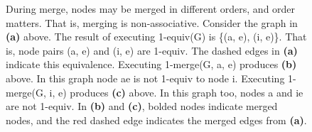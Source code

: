 \begin{figure}
\centering
{}
\caption{During merge, nodes may be merged in different orders, and
  order matters. That is, merging is non-associative.  Consider the
  graph in \textbf{(a)} above. The result of executing 1-equiv(G) is
  \{(a, e), (i, e)\}. That is, node pairs (a, e) and (i, e) are
  1-equiv. The dashed edges in \textbf{(a)} indicate this
  equivalence. Executing 1-merge(G, a, e) produces \textbf{(b)}
  above. In this graph node ae is not 1-equiv to node
  i. Executing 1-merge(G, i, e) produces \textbf{(c)} above. In this
  graph too, nodes a and ie are not 1-equiv. In \textbf{(b)} and
  \textbf{(c)}, bolded nodes indicate merged nodes, and the red dashed
  edge indicates the merged edges from \textbf{(a)}.}
\label{fig:gk_nondeterministic_merge}
\end{figure}

